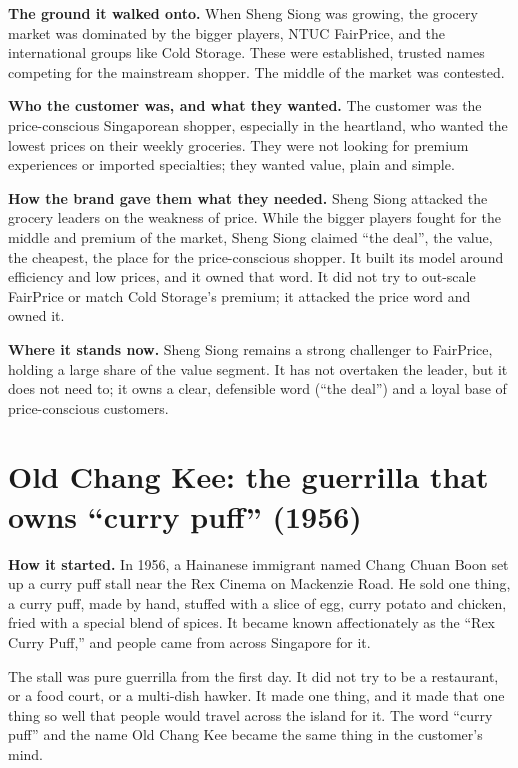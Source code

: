 \documentclass[10pt,twoside,openany]{memoir}
\newcommand{\needspacehead}{\needspace{4\baselineskip}}
\let\oldsection\section
\renewcommand{\section}{\needspacehead\oldsection}
\begin{document}
\textbf{The ground it walked onto.} When Sheng Siong was growing, the
grocery market was dominated by the bigger players, NTUC FairPrice, and
the international groups like Cold Storage. These were established,
trusted names competing for the mainstream shopper. The middle of the
market was contested.

\textbf{Who the customer was, and what they wanted.} The customer was
the price-conscious Singaporean shopper, especially in the heartland,
who wanted the lowest prices on their weekly groceries. They were not
looking for premium experiences or imported specialties; they wanted
value, plain and simple.

\textbf{How the brand gave them what they needed.} Sheng Siong attacked
the grocery leaders on the weakness of price. While the bigger players
fought for the middle and premium of the market, Sheng Siong claimed
``the deal'', the value, the cheapest, the place for the price-conscious
shopper. It built its model around efficiency and low prices, and it
owned that word. It did not try to out-scale FairPrice or match Cold
Storage's premium; it attacked the price word and owned it.

\textbf{Where it stands now.} Sheng Siong remains a strong challenger to
FairPrice, holding a large share of the value segment. It has not
overtaken the leader, but it does not need to; it owns a clear,
defensible word (``the deal'') and a loyal base of price-conscious
customers.

\section{Old Chang Kee: the guerrilla that owns ``curry puff''
(1956)}\label{old-chang-kee-the-guerrilla-that-owns-curry-puff-1956}

\textbf{How it started.} In 1956, a Hainanese immigrant named Chang
Chuan Boon set up a curry puff stall near the Rex Cinema on Mackenzie
Road. He sold one thing, a curry puff, made by hand, stuffed with a
slice of egg, curry potato and chicken, fried with a special blend of
spices. It became known affectionately as the ``Rex Curry Puff,'' and
people came from across Singapore for it.

The stall was pure guerrilla from the first day. It did not try to be a
restaurant, or a food court, or a multi-dish hawker. It made one thing,
and it made that one thing so well that people would travel across the
island for it. The word ``curry puff'' and the name Old Chang Kee became
the same thing in the customer's mind.
\end{document}
